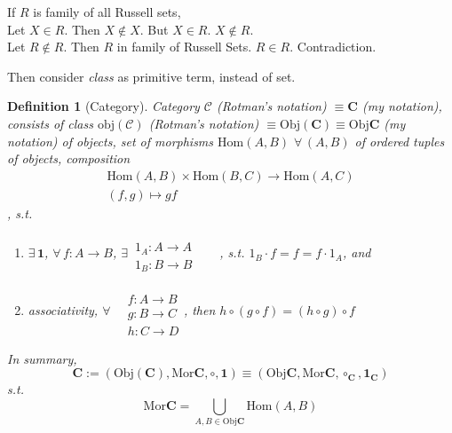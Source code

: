 \documentclass[10pt]{amsart}
\newtheorem{definition}{Definition}
\begin{document}
\begin{multicols*}{2}
If $R$ is family of all Russell sets,  \\
Let $X\in R$.  Then $X\notin X$.  But $X\in R$.  $X\notin R$.  \\
Let $R\notin R$.  Then $R$ in family of Russell Sets.  $R\in R$.  Contradiction.  

Then consider \emph{class} as primitive term, instead of set.  

\begin{definition}[Category]
Category $\mathcal{C}$ (Rotman's notation) $\equiv \mathbf{C}$ (my notation), consists of class $\text{obj}(\mathcal{C})$ (Rotman's notation) $\equiv \text{Obj}(\mathbf{C}) \equiv \text{Obj}\mathbf{C}$ (my notation) of objects, set of  morphisms $\text{Hom}(A,B)$ $\forall \,  (A,B)$ of ordered tuples of objects, composition 
\[
\begin{gathered} 
	\text{Hom}(A,B)\times \text{Hom}(B ,C) \to \text{Hom}(A,C) \\
(f,g)\mapsto gf \end{gathered}
\], s.t.
\begin{enumerate}
\item $\exists \, \mathbf{1}$, $\forall \, f:A\to B$, $\exists \, \begin{aligned} & \quad \\ 
1_A : A \to A \\
1_B : B \to B \end{aligned}$, s.t. $1_B \cdot f = f= f\cdot 1_A$, and 
\item associativity, $\forall \, \begin{aligned} & \quad \\
& f : A\to B \\
& g: B\to C \\
& h: C\to D \end{aligned}$, then $h\circ (g\circ f) = (h\circ g) \circ f$ 
\end{enumerate}

In summary, 
\begin{equation}
	\mathbf{C} := (\text{Obj}(\mathbf{C}), \text{Mor}\mathbf{C}, \circ, \mathbf{1}) \equiv (\text{Obj}\mathbf{C}, \text{Mor}\mathbf{C}, \circ_{\mathbf{C}}, \mathbf{1}_{\mathbf{C}})
\end{equation}
s.t. 
\[
\text{Mor}\mathbf{C} = \bigcup_{A,B \in \text{Obj}\mathbf{C}} \text{Hom}(A,B)
\]
\end{definition}


\end{multicols*}
\end{document}
